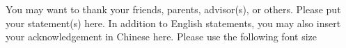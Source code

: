 \begin{acknowledgement}
    You may want to thank your friends, parents, advisor(s), or others. Please put your statement(s) here. 
In addition to English statements, you may also insert your acknowledgement in Chinese here. Please use the following font size

\end{acknowledgement}

\vfill